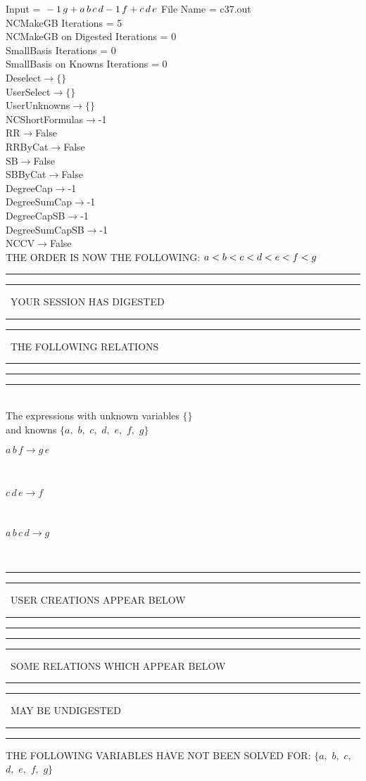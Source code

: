 \documentclass[rep10,leqno]{report}
\begin{document}
\normalsize
\baselineskip=12pt
\noindent
Input = 
$
\\-1\,
 g + a\,
 b\,
 c\,
 d\\
-1\,
 f + c\,
 d\,
 e\\
$
File Name = c37.out\\
NCMakeGB Iterations = 5\\
NCMakeGB on Digested Iterations = 0\\
SmallBasis Iterations = 0\\
SmallBasis on Knowns Iterations = 0\\
Deselect$\rightarrow \{\}$\\
UserSelect$\rightarrow \{\}$\\
UserUnknowns$\rightarrow \{\}$\\
NCShortFormulas$\rightarrow$-1\\
RR$\rightarrow $False\\
RRByCat$\rightarrow $False\\
SB$\rightarrow $False\\
SBByCat$\rightarrow $False\\
DegreeCap$\rightarrow $-1\\
DegreeSumCap$\rightarrow $-1\\
DegreeCapSB$\rightarrow $-1\\
DegreeSumCapSB$\rightarrow $-1\\
NCCV$\rightarrow $False\\
THE ORDER IS NOW THE FOLLOWING:\hfil\break
$
a<b<c<d<e<f<g\\
$
\rule[2pt]{6in}{4pt}\hfil\break
\rule[2pt]{1.879in}{4pt}
\ YOUR SESSION HAS DIGESTED\ 
\rule[2pt]{1.879in}{4pt}\hfil\break
\rule[2pt]{1.923in}{4pt}
\ THE FOLLOWING RELATIONS\ 
\rule[2pt]{1.923in}{4pt}\hfil\break
\rule[2pt]{6in}{4pt}\hfil\break
\rule[3pt]{6in}{.7pt}\\
The expressions with unknown variables $\{\}$\\
and knowns $\{a,
$ $
b,
$ $
c,
$ $
d,
$ $
e,
$ $
f,
$ $
g\}$\smallskip\\
\begin{minipage}{6in}
$
a\,
 b\,
 f\rightarrow g\,
 e
$
\end{minipage}\medskip \\
\begin{minipage}{6in}
$
c\,
 d\,
 e\rightarrow f
$
\end{minipage}\medskip \\
\begin{minipage}{6in}
$
a\,
 b\,
 c\,
 d\rightarrow g
$
\end{minipage}\\
\rule[2pt]{6in}{1pt}\hfil\break
\rule[2.5pt]{1.701in}{1pt}
\ USER CREATIONS APPEAR BELOW\ 
\rule[2.5pt]{1.701in}{1pt}\hfil\break
\rule[2pt]{6in}{1pt}\hfil\break
\rule[2pt]{6in}{4pt}\hfil\break
\rule[2pt]{1.45in}{4pt}
\ SOME RELATIONS WHICH APPEAR BELOW\ 
\rule[2pt]{1.45in}{4pt}\hfil\break
\rule[2pt]{2.18in}{4pt}
\ MAY BE UNDIGESTED\ 
\rule[2pt]{2.18in}{4pt}\hfil\break
\rule[2pt]{6in}{4pt}\hfil\break
THE FOLLOWING VARIABLES HAVE NOT BEEN SOLVED FOR:\hfil\break
$\{a,
$ $
b,
$ $
c,
$ $
d,
$ $
e,
$ $
f,
$ $
g\}$
\smallskip\\
\vspace{10pt}
\end{document}
